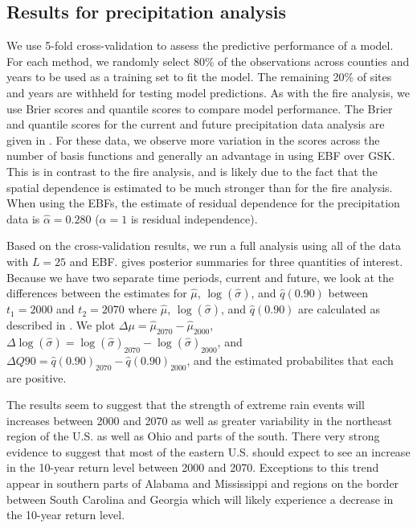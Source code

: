 \subsection{Results for precipitation analysis}\label{ebs:results-precip}
We use 5-fold cross-validation to assess the predictive performance of a model.
For each method, we randomly select 80\% of the observations across counties and years to be used as a training set to fit the model.
The remaining 20\% of sites and years are withheld for testing model predictions.
As with the fire analysis, we use Brier scores and quantile scores to compare model performance.
The Brier and quantile scores for the current and future precipitation data analysis are given in .
For these data, we observe more variation in the scores across the number of basis functions and generally an advantage in using EBF over GSK.
This is in contrast to the fire analysis, and is likely due to the fact that the spatial dependence is estimated to be much stronger than for the fire analysis.
When using the EBFs, the estimate of residual dependence for the precipitation data is $\hat{\alpha} = 0.280$ ($\alpha = 1$ is residual independence).

Based on the cross-validation results, we run a full analysis using all of the data with $L = 25$ and EBF.
 gives posterior summaries for three quantities of interest.
Because we have two separate time periods, current and future, we look at the differences between the estimates for $\hat{\mu}$, $\log(\hat{\sigma})$, and $\hat{q}(0.90)$ between $t_1 = 2000$ and $t_2 = 2070$ where $\hat{\mu}$, $\log(\hat{\sigma})$, and $\hat{q}(0.90)$ are calculated as described in .
We plot \mbox{$\Delta \mu = \hat{\mu}_{2070} - \hat{\mu}_{2000}$}, \mbox{$\Delta \log(\hat{\sigma}) = \log(\hat{\sigma})_{2070} - \log(\hat{\sigma})_{2000}$}, and \mbox{$\Delta Q90 = \hat{q}(0.90)_{2070} - \hat{q}(0.90)_{2000}$}, and the estimated probabilites that each are positive.

The results seem to suggest that the strength of extreme rain events will increases between 2000 and 2070 as well as greater variability in the northeast region of the U.S. as well as Ohio and parts of the south.
There very strong evidence to suggest that most of the eastern U.S. should expect to see an increase in the 10-year return level between 2000 and 2070.
Exceptions to this trend appear in southern parts of Alabama and Mississippi and regions on the border between South Carolina and Georgia which will likely experience a decrease in the 10-year return level.

